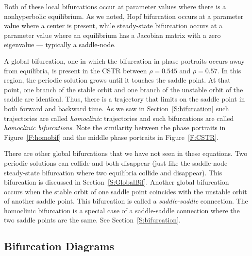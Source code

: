 \documentclass{ximera}
\begin{document}
Both of these local bifurcations occur at parameter values where
there is a nonhyperbolic equilibrium. As we noted, Hopf
bifurcation occurs at a parameter value where a center is
present, while steady-state bifurcation occurs at a parameter value where 
an equilibrium has a Jacobian matrix with a zero eigenvalue --- typically 
a saddle-node.  

A global bifurcation, one in which the bifurcation
in phase portraits occurs away from equilibria, is present in the CSTR 
between $\rho=0.545$ and $\rho=0.57$.  In this region, the periodic solution 
grows until it touches the saddle point.  At that point, one branch of 
the stable orbit and one branch of the unstable orbit of the 
saddle are identical.  Thus, there is a trajectory that limits
on the saddle point in both forward and backward time.  As we 
saw in Section~\ref{S:bifurcation} such trajectories are called 
{\em homoclinic\/} trajectories and such bifurcations are called 
{\em homoclinic bifurcations\/}.   
  Note the similarity between the phase 
portraits in Figure~\ref{F:homobif} and the middle phase portraits in 
Figure~\ref{F:CSTR}.

There are other global bifurcations that we have not seen in 
these equations.  Two periodic solutions can collide and both 
disappear (just like the saddle-node steady-state bifurcation 
where two equilibria collide and disappear).  This bifurcation is
discussed in Section~\ref{S:GlobalBif}.  Another global 
bifurcation occurs when the stable orbit of one saddle point 
coincides with the unstable orbit of another saddle point.  
This bifurcation is called a {\em saddle-saddle\/} connection.  
The homoclinic bifurcation is a special case of a saddle-saddle 
connection where the two saddle points are the same.
  See Section~\ref{S:bifurcation}.

\subsection*{Bifurcation Diagrams}
\end{document}
